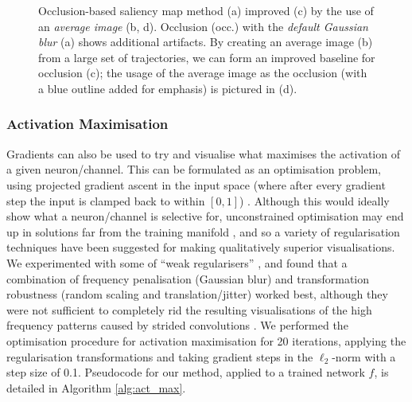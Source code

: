 \begin{figure}
\begin{subfigure}{0.32\columnwidth}
  \end{subfigure}
  \caption{Occlusion-based saliency map method (a) improved (c) by the use of an \textit{average image} (b, d). Occlusion (occ.) with the \textit{default Gaussian blur} (a) shows additional artifacts. By creating an average image (b) from a large set of trajectories, we can form an improved baseline for occlusion (c); the usage of the average image as the occlusion (with a blue outline added for emphasis) is pictured in (d).}
  \label{fig:saliency_baseline}
\end{figure}

\hypertarget{activation-maximisation}{%
\subsubsection{Activation Maximisation}\label{activation-maximisation}}

\label{sec:act_max}

Gradients can also be used to try and visualise what maximises the
activation of a given neuron/channel. This can be formulated as an
optimisation problem, using projected gradient ascent in the input space
(where after every gradient step the input is clamped back to within
\([0, 1]\)) \cite{erhan2009visualizing}. Although this would ideally
show what a neuron/channel is selective for, unconstrained optimisation
may end up in solutions far from the training manifold
\cite{mahendran2015understanding}, and so a variety of regularisation
techniques have been suggested for making qualitatively superior
visualisations. We experimented with some of ``weak regularisers''
\cite{olah2017feature}, and found that a combination of frequency
penalisation (Gaussian blur) \cite{nguyen2015deep} and transformation
robustness (random scaling and translation/jitter)
\cite{mordvintsev2015inceptionism} worked best, although they were not
sufficient to completely rid the resulting visualisations of the high
frequency patterns caused by strided convolutions
\cite{odena2016deconvolution}. We performed the optimisation procedure
for activation maximisation for 20 iterations, applying the
regularisation transformations and taking gradient steps in the
\(\ell_2\)-norm \cite{madry2018towards} with a step size of 0.1.
Pseudocode for our method, applied to a trained network \(f\), is
detailed in Algorithm \ref{alg:act_max}.

